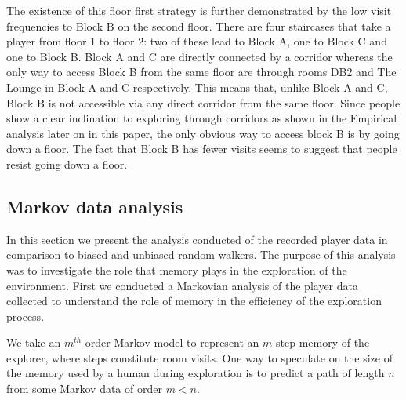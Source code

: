 The existence of this floor first strategy is further demonstrated by the low visit frequencies to Block B on the second floor. There are four staircases that take a player from floor 1 to floor 2: two of these lead to Block A, one to Block C and one to Block B. Block A and C are directly connected by a corridor whereas the only way to access Block B from the same floor are through rooms DB2 and The Lounge in Block A and C respectively. This means that, unlike Block A and C, Block B is not accessible via any direct corridor from the same floor. Since people show a clear inclination to exploring through corridors as shown in the Empirical analysis later on in this paper, the only obvious way to access block B is by going down a floor. The fact that Block B has fewer visits seems to suggest that people resist going down a floor.





\subsection{Markov data analysis}
\label{sec:Markov_data_analysis}


In this section we present the analysis conducted of the recorded player data in comparison to biased and unbiased random walkers. The purpose of this analysis was to investigate the role that memory plays in the exploration of the environment. First we conducted a Markovian analysis of the player data collected to understand the role of memory in the efficiency of the exploration process.

We take an $m^{th}$ order Markov model to represent an $m$-step memory of the explorer, where steps constitute room visits. One way to speculate on the size of the memory used by a human during exploration is to predict a path of length $n$ from some Markov data of order $m < n$.

